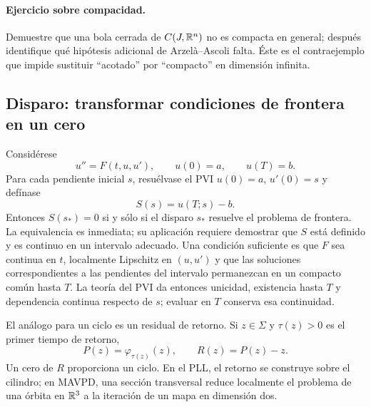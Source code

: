 \paragraph{Ejercicio sobre compacidad.}
Demuestre que una bola cerrada de \(C(J,\mathbb{R}^n)\) no es compacta en general;
después identifique qué hipótesis adicional de Arzelà--Ascoli falta. Éste es el
contraejemplo que impide sustituir ``acotado'' por ``compacto'' en dimensión
infinita.

\subsection{Disparo: transformar condiciones de frontera en un cero}

Considérese
\begin{equation}
 u''=F(t,u,u'),\qquad u(0)=a,\qquad u(T)=b.
 \label{eq:guide-shooting-bvp}
\end{equation}
Para cada pendiente inicial $s$, resuélvase el PVI
$u(0)=a$, $u'(0)=s$ y defínase
\begin{equation}
 S(s)=u(T;s)-b.
 \label{eq:guide-shooting-residual}
\end{equation}
Entonces $S(s_*)=0$ si y sólo si el disparo $s_*$ resuelve el problema de
frontera. La equivalencia es inmediata; su aplicación requiere demostrar que
$S$ está definido y es continuo en un intervalo adecuado.
Una condición suficiente es que $F$ sea continua en $t$, localmente
Lipschitz en $(u,u')$ y que las soluciones correspondientes a las
pendientes del intervalo permanezcan en un compacto común hasta $T$.
La teoría del PVI da entonces unicidad, existencia hasta $T$ y dependencia
continua respecto de $s$; evaluar en $T$ conserva esa continuidad.

El análogo para un ciclo es un residual de retorno. Si $z\in\Sigma$ y
$\tau(z)>0$ es el primer tiempo de retorno,
\begin{equation}
 P(z)=\varphi_{\tau(z)}(z),\qquad R(z)=P(z)-z.
 \label{eq:guide-return-residual}
\end{equation}
Un cero de $R$ proporciona un ciclo. En el PLL, el retorno se construye sobre
el cilindro; en MAVPD, una sección transversal reduce localmente el problema
de una órbita en $\mathbb{R}^3$ a la iteración de un mapa en dimensión dos.

